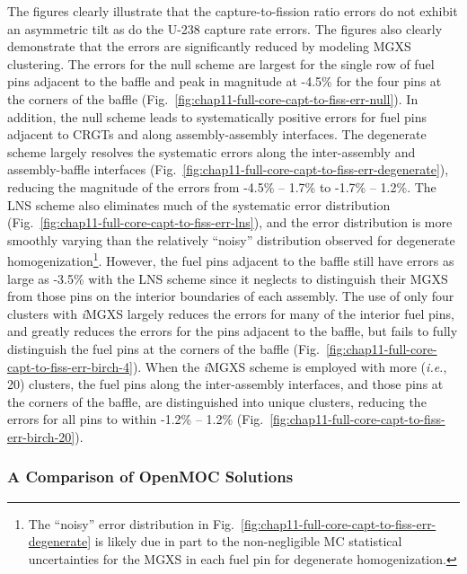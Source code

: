 The figures clearly illustrate that the capture-to-fission ratio errors do not exhibit an asymmetric tilt as do the U-238 capture rate errors. The figures also clearly demonstrate that the errors are significantly reduced by modeling \ac{MGXS} clustering. The errors for the null scheme are largest for the single row of fuel pins adjacent to the baffle and peak in magnitude at -4.5\% for the four pins at the corners of the baffle (Fig.~\ref{fig:chap11-full-core-capt-to-fiss-err-null}). In addition, the null scheme leads to systematically positive errors for fuel pins adjacent to \acp{CRGT} and along assembly-assembly interfaces. The degenerate scheme largely resolves the systematic errors along the inter-assembly and assembly-baffle interfaces (Fig.~\ref{fig:chap11-full-core-capt-to-fiss-err-degenerate}), reducing the magnitude of the errors from -4.5\% -- 1.7\% to -1.7\% -- 1.2\%. The \ac{LNS} scheme also eliminates much of the systematic error distribution (Fig.~\ref{fig:chap11-full-core-capt-to-fiss-err-lns}), and the error distribution is more smoothly varying than the relatively ``noisy'' distribution observed for degenerate homogenization\footnote{The ``noisy'' error distribution in Fig.~\ref{fig:chap11-full-core-capt-to-fiss-err-degenerate} is likely due in part to the non-negligible \ac{MC} statistical uncertainties for the \ac{MGXS} in each fuel pin for degenerate homogenization.}. However, the fuel pins adjacent to the baffle still have errors as large as -3.5\% with the \ac{LNS} scheme since it neglects to distinguish their \ac{MGXS} from those pins on the interior boundaries of each assembly. The use of only four clusters with \textit{i}\ac{MGXS} largely reduces the errors for many of the interior fuel pins, and greatly reduces the errors for the pins adjacent to the baffle, but fails to fully distinguish the fuel pins at the corners of the baffle (Fig.~\ref{fig:chap11-full-core-capt-to-fiss-err-birch-4}). When the \textit{i}\ac{MGXS} scheme is employed with more (\textit{i.e.}, 20) clusters, the fuel pins along the inter-assembly interfaces, and those pins at the corners of the baffle, are distinguished into unique clusters, reducing the errors for all pins to within -1.2\% -- 1.2\% (Fig.~\ref{fig:chap11-full-core-capt-to-fiss-err-birch-20}).

\clearpage

\subsubsection{A Comparison of OpenMOC Solutions}
\label{subsec:chap11-imgxs-capt-rates-compare}


